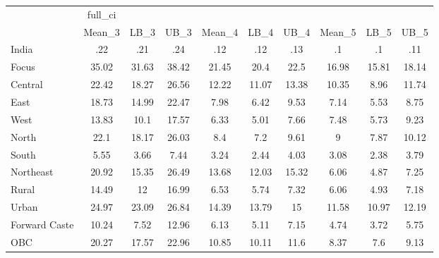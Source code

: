 \begin{tabular}{l*{9}{c}}
\toprule
                    &     full\_ci&            &            &            &            &            &            &            &            \\
                    &      Mean\_3&        LB\_3&        UB\_3&      Mean\_4&        LB\_4&        UB\_4&      Mean\_5&        LB\_5&        UB\_5\\
\midrule
India               &         .22&         .21&         .24&         .12&         .12&         .13&          .1&          .1&         .11\\
Focus               &       35.02&       31.63&       38.42&       21.45&        20.4&        22.5&       16.98&       15.81&       18.14\\
Central             &       22.42&       18.27&       26.56&       12.22&       11.07&       13.38&       10.35&        8.96&       11.74\\
East                &       18.73&       14.99&       22.47&        7.98&        6.42&        9.53&        7.14&        5.53&        8.75\\
West                &       13.83&        10.1&       17.57&        6.33&        5.01&        7.66&        7.48&        5.73&        9.23\\
North               &        22.1&       18.17&       26.03&         8.4&         7.2&        9.61&           9&        7.87&       10.12\\
South               &        5.55&        3.66&        7.44&        3.24&        2.44&        4.03&        3.08&        2.38&        3.79\\
Northeast           &       20.92&       15.35&       26.49&       13.68&       12.03&       15.32&        6.06&        4.87&        7.25\\
Rural               &       14.49&          12&       16.99&        6.53&        5.74&        7.32&        6.06&        4.93&        7.18\\
Urban               &       24.97&       23.09&       26.84&       14.39&       13.79&          15&       11.58&       10.97&       12.19\\
Forward Caste       &       10.24&        7.52&       12.96&        6.13&        5.11&        7.15&        4.74&        3.72&        5.75\\
OBC                 &       20.27&       17.57&       22.96&       10.85&       10.11&        11.6&        8.37&         7.6&        9.13\\

\end{tabular}
